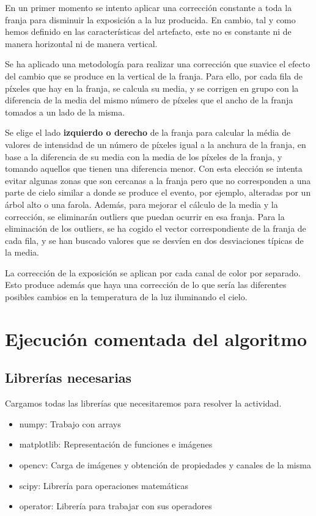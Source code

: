 \documentclass[11pt]{article}
\providecommand{\tightlist}{%
      \setlength{\itemsep}{0pt}\setlength{\parskip}{0pt}}
\begin{document}
En un primer momento se intento aplicar una corrección constante a toda
la franja para disminuir la exposición a la luz producida. En cambio,
tal y como hemos definido en las características del artefacto, este no
es constante ni de manera horizontal ni de manera vertical.

Se ha aplicado una metodología para realizar una corrección que suavice
el efecto del cambio que se produce en la vertical de la franja. Para
ello, por cada fila de píxeles que hay en la franja, se calcula su
media, y se corrigen en grupo con la diferencia de la media del mismo
número de píxeles que el ancho de la franja tomados a un lado de la
misma.

Se elige el lado \textbf{izquierdo o derecho} de la franja para calcular
la média de valores de intensidad de un número de píxeles igual a la
anchura de la franja, en base a la diferencia de su media con la media
de los píxeles de la franja, y tomando aquellos que tienen una
diferencia menor. Con esta elección se intenta evitar algunas zonas que
son cercanas a la franja pero que no corresponden a una parte de cielo
similar a donde se produce el evento, por ejemplo, alteradas por un
árbol alto o una farola. Además, para mejorar el cálculo de la media y
la corrección, se eliminarán outliers que puedan ocurrir en esa franja.
Para la eliminación de los outliers, se ha cogido el vector
correspondiente de la franja de cada fila, y se han buscado valores que
se desvíen en dos desviaciones típicas de la media.

La corrección de la exposición se aplican por cada canal de color por
separado. Esto produce además que haya una corrección de lo que sería
las diferentes posibles cambios en la temperatura de la luz iluminando
el cielo.

    \hypertarget{ejecuciuxf3n-comentada-del-algoritmo}{%
\section{Ejecución comentada del
algoritmo}\label{ejecuciuxf3n-comentada-del-algoritmo}}

\hypertarget{libreruxedas-necesarias}{%
\subsection{Librerías necesarias}\label{libreruxedas-necesarias}}

Cargamos todas las librerías que necesitaremos para resolver la
actividad.

\begin{itemize}
\tightlist
\item
  numpy: Trabajo con arrays
\item
  matplotlib: Representación de funciones e imágenes
\item
  opencv: Carga de imágenes y obtención de propiedades y canales de la
  misma
\item
  scipy: Librería para operaciones matemáticas
\item
  operator: Librería para trabajar con sus operadores
\end{itemize}
\end{document}
